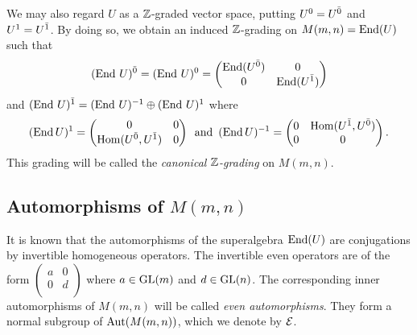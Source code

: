 We may also regard $U$ as a $\mathbb{Z}$-graded vector space, putting $U^0=U^{\bar0}$ and $U^1=U^{\bar1}$. By doing so, we obtain an induced $\mathbb{Z}$-grading on $M(m,n) = \operatorname{End} (U)$ such that
%
\[(\operatorname{End}\, U)^{\bar0} =(\operatorname{End}\, U)^0 =
	\left(\begin{matrix}
			\operatorname{End}(U^{\bar0}) & 0           \\
			0            & \operatorname{End}(U^{\bar1}) \\
		\end{matrix}
	\right)
\]
%
and $(\operatorname{End}\, U)^{\bar1} = (\operatorname{End}\, U)^{-1}\oplus (\operatorname{End}\, U)^1$ where
%
\[(\operatorname{End} U)^{1}=
	\left(\begin{matrix}
			0                  & 0 \\
			\operatorname{Hom}(U^{\bar0},U^{\bar1}) & 0 \\
		\end{matrix}
	\right) \,\text{ and }\, (\operatorname{End} U)^{-1}=
	\left(\begin{matrix}
			0 & \operatorname{Hom}(U^{\bar1},U^{\bar0}) \\
			0 & 0                  \\
		\end{matrix}
	\right).
\]
%
This grading will be called the \emph{canonical $\mathbb{Z}$-grading} on $M(m,n)$.%

\subsection{Automorphisms of $M(m,n)$}

It is known that the automorphisms of the superalgebra $\operatorname{End}(U)$ are conjugations by invertible homogeneous operators.
The invertible even operators are of the form $\left( \begin{matrix}
			a & 0 \\
			0 & d \\
		\end{matrix}\right)$ where $a\in \operatorname{GL}(m)$ and $d\in \operatorname{GL}(n)$. The corresponding inner automorphisms of $M(m,n)$ will be called \emph{even automorphisms}.
They form a normal subgroup of $\operatorname{Aut}(M(m,n))$, which we denote by $\mathcal E$.

